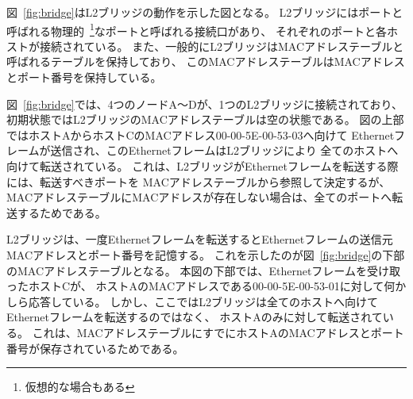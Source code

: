図~\ref{fig:bridge}はL2ブリッジの動作を示した図となる。
L2ブリッジにはポートと呼ばれる物理的~\footnote{仮想的な場合もある}なポートと呼ばれる接続口があり、
それぞれのポートと各ホストが接続されている。
また、一般的にL2ブリッジはMACアドレステーブルと呼ばれるテーブルを保持しており、
このMACアドレステーブルはMACアドレスとポート番号を保持している。

図~\ref{fig:bridge}では、4つのノードA〜Dが、1つのL2ブリッジに接続されており、
初期状態ではL2ブリッジのMACアドレステーブルは空の状態である。
図の上部ではホストAからホストCのMACアドレス00-00-5E-00-53-03へ向けて
Ethernetフレームが送信され、このEthernetフレームはL2ブリッジにより
全てのホストへ向けて転送されている。
これは、L2ブリッジがEthernetフレームを転送する際には、転送すべきポートを
MACアドレステーブルから参照して決定するが、
MACアドレステーブルにMACアドレスが存在しない場合は、全てのポートへ転送するためである。

L2ブリッジは、一度Ethernetフレームを転送するとEthernetフレームの送信元MACアドレスとポート番号を記憶する。
これを示したのが図~\ref{fig:bridge}の下部のMACアドレステーブルとなる。
本図の下部では、Ethernetフレームを受け取ったホストCが、
ホストAのMACアドレスである00-00-5E-00-53-01に対して何かしら応答している。
しかし、ここではL2ブリッジは全てのホストへ向けてEthernetフレームを転送するのではなく、
ホストAのみに対して転送されている。
これは、MACアドレステーブルにすでにホストAのMACアドレスとポート番号が保存されているためである。

